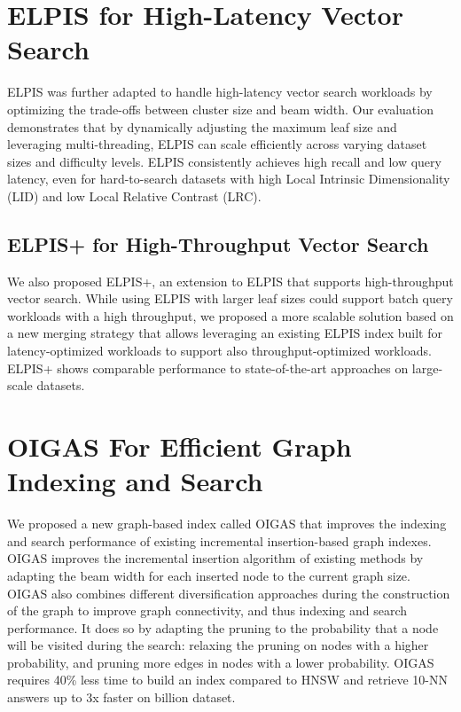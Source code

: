\section{ELPIS for High-Latency Vector Search}
ELPIS was further adapted to handle high-latency vector search workloads by optimizing the trade-offs between cluster size and beam width. Our evaluation demonstrates that by dynamically adjusting the maximum leaf size and leveraging multi-threading, ELPIS can scale efficiently across varying dataset sizes and difficulty levels. ELPIS consistently achieves high recall and low query latency, even for hard-to-search datasets with high Local Intrinsic Dimensionality (LID) and low Local Relative Contrast (LRC).
\subsection{ELPIS+ for High-Throughput Vector Search}

We also proposed ELPIS+, an extension to ELPIS that supports high-throughput vector search.
While using ELPIS with larger leaf sizes could support batch query workloads with a high throughput, we proposed a more scalable solution based on a new merging strategy that allows leveraging an existing ELPIS index built for latency-optimized workloads to support also throughput-optimized workloads. ELPIS+ shows comparable performance to state-of-the-art approaches on large-scale datasets.  

\section{OIGAS For Efficient Graph Indexing and Search}

We proposed a new graph-based index called OIGAS that improves the indexing and search performance of existing incremental insertion-based graph indexes. OIGAS improves the incremental insertion algorithm of existing methods by adapting the beam width for each inserted node to the current graph size. OIGAS also combines different diversification approaches during the construction of the graph to improve graph connectivity, and thus indexing and search performance. It does so by adapting the pruning to the probability that a node will be visited during the search: relaxing the pruning on nodes with a higher probability, and pruning more edges in nodes with a lower probability.   
OIGAS requires 40\% less time to build an index compared to HNSW  and retrieve 10-NN answers up to 3x faster on billion dataset.

